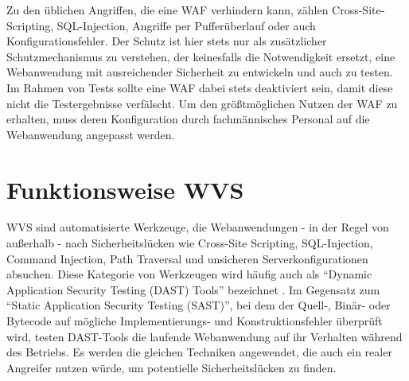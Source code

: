 \documentclass[12pt,oneside,a4paper,parskip]{scrbook}
\begin{document}
    Zu den üblichen Angriffen, die eine WAF verhindern kann, zählen Cross-Site-Scripting, SQL-Injection,
    Angriffe per Pufferüberlauf oder auch Konfigurationsfehler. Der Schutz ist hier stets nur als zusätzlicher Schutzmechanismus zu verstehen, der keinesfalls die Notwendigkeit ersetzt, eine    Webanwendung mit ausreichender Sicherheit zu entwickeln und auch zu testen. Im Rahmen von Tests
    sollte eine WAF dabei stets deaktiviert sein, damit diese nicht die Testergebnisse verfälscht.
    Um den größtmöglichen Nutzen der WAF zu erhalten, muss deren Konfiguration durch fachmännisches
    Personal auf die Webanwendung angepasst werden. \cite{BSI} \cite{WAF}


    \newpage

  \section{Funktionsweise WVS}
  WVS sind automatisierte Werkzeuge, die Webanwendungen - in der Regel von außerhalb - nach Sicherheitslücken wie Cross-Site Scripting, SQL-Injection, Command Injection, Path Traversal und unsicheren Serverkonfigurationen absuchen. Diese Kategorie von Werkzeugen wird häufig auch als ``Dynamic Application Security Testing (DAST) Tools'' bezeichnet \cite{OWASPtools}. Im Gegensatz zum ``Static Application Security Testing (SAST)'', bei dem der Quell-, Binär- oder Bytecode auf mögliche Implementierungs- und Konstruktionsfehler überprüft wird, testen DAST-Tools die laufende Webanwendung auf ihr Verhalten während des Betriebs. Es werden die gleichen Techniken angewendet, die auch ein realer Angreifer nutzen würde, um potentielle Sicherheitslücken zu finden.
\end{document}
